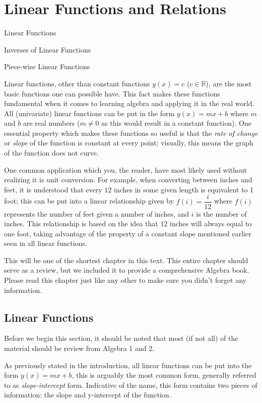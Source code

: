 \documentclass[../book.tex]{subfiles}
\begin{document}
\chapter{Linear Functions and Relations}
\begin{introduction}[Contents]
\item Linear Functions
\item Inverses of Linear Functions
\item Piece-wise Linear Functions
\end{introduction}
\noindent Linear functions, other than constant functions $y(x)=c$ ($c\in\mathbb{R}$), are the most basic functions one can possible have.  This fact makes these functions fundamental when it comes to learning algebra and applying it in the real world.  All (univariate) linear functions can be put in the form $y(x)=mx+b$ where $m$ and $b$ are real numbers ($m\neq 0$ as this would result in a constant function).  One essential property which makes these functions so useful is that the \textit{rate of change} or \textit{slope} of the function is constant at every point; visually, this means the graph of the function does not curve.  

One common application which you, the reader, have most likely used without realizing it is unit conversion.  For example, when converting between inches and feet, it is understood that every $12$ inches in some given length is equivalent to 1 foot; this can be put into a linear relationship given by $f(i)=\dfrac{i}{12}$ where $f(i)$ represents the number of feet given a number of inches, and $i$ is the number of inches.  This relationship is based on the idea that $12$ inches will always equal to one foot, taking advantage of the property of a constant slope mentioned earlier seen in all linear functions.

This will be one of the shortest chapter in this text.  This entire chapter should serve as a review, but we included it to provide a comprehensive Algebra book.  Please read this chapter just like any other to make sure you didn't forget any information.
\section{Linear Functions}
\noindent Before we begin this section, it should be noted that most (if not all) of the material should be review from Algebra 1 and 2.

As previously stated in the introduction, all linear functions can be put into the form $y(x)=mx+b$, this is arguably the most common form, generally referred to as \textit{slope-intercept} form.  Indicative of the name, this form contains two pieces of information: the slope and y-intercept of the function.
\end{document}
